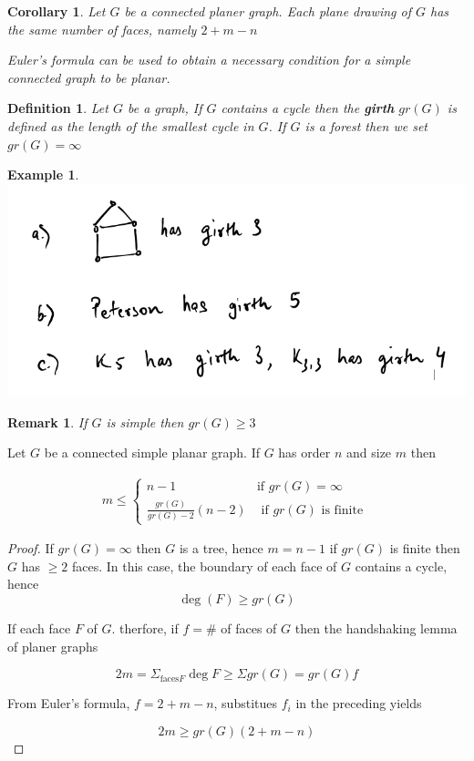 \documentclass[12pt]{article}
\newenvironment{theorem}[1]{%
  \renewcommand\themanualtheoreminner{#1}%
  \manualtheoreminner
}{\endmanualtheoreminner}
\newtheorem*{corollary}{Corollary}
\newtheorem{example}{Example}
\newtheorem{definition}{Definition}
\newtheorem*{remark}{Remark}
\newenvironment{pro}{\begin{proof}}{\end{proof}}
\begin{document}
\begin{corollary}

	Let $G$ be a connected planer graph. Each plane drawing of $G$ has the same number of faces, namely $2+m - n$

	Euler's formula can be used to obtain a necessary condition for a simple connected graph to be planar.
\end{corollary}

\begin{definition}
	Let $G$ be a graph, If $G$ contains a cycle then the \textbf{girth} $gr(G)$ is defined as the length of the smallest cycle in $G$. If $G$ is a forest then we set $gr(G) = \infty$
\end{definition}

\begin{example}

	\includegraphics[scale=0.5]{example}

\end{example}


\begin{remark}
	If $G$ is simple then $gr(G) \ge 3$
\end{remark}


\begin{theorem}{4}
	Let $G$ be a connected simple planar graph. If $G$ has order $n$ and size $m$ then

	\begin{align} m \le \begin{cases} n-1                          & \text{if } gr(G) = \infty             \\
			\frac{gr(G)}{gr(G) - 2}(n-2) & \text{ if  } gr(G) \text{ is finite }\end{cases}
	\end{align}
\end{theorem}


\begin{pro}
	If $gr(G) = \infty$ then $G$ is a tree, hence $m = n-1$ if $gr(G)$ is finite then $G$ has $\ge 2$ faces. In this case, the boundary of each face of $G$ contains a cycle, hence
	\[\deg (F) \ge gr(G)\]

	If each face $F$ of $G$. therfore, if $f = \#$ of faces of $G$ then the handshaking lemma of planer graphs

	\[ 2m = \Sigma_{\text{faces} F} \deg F \ge \Sigma gr(G) = gr(G) f\]

	From Euler's formula, $f = 2+m-n$, substitues $f_{i}$ in the preceding yields

	\[2m \ge gr(G) (2+m-n)\]
\end{pro}
\end{document}
